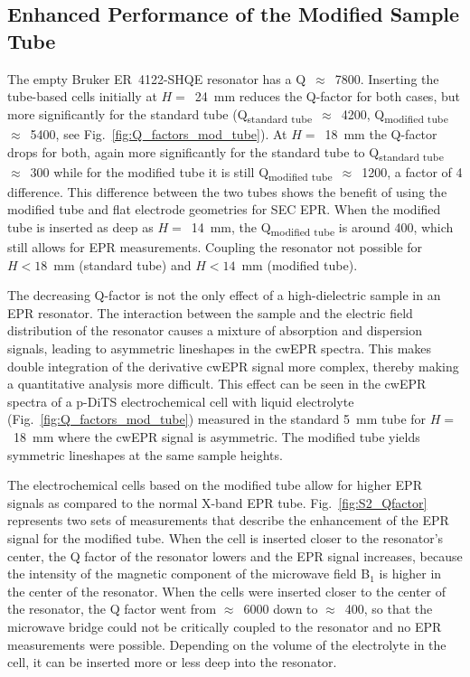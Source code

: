 \subsection{Enhanced Performance of the Modified Sample Tube}\label{Q-factor_SNR}

The empty Bruker ER~4122-SHQE resonator has a Q~$\approx$~7800. Inserting the tube-based cells initially at $H=$~24~mm reduces the Q-factor for both cases, but more significantly for the standard tube (Q\textsubscript{standard tube}~$\approx$~4200, Q\textsubscript{modified tube}~$\approx$~5400, see Fig.~\ref{fig:Q_factors_mod_tube}). At $H=$~18~mm the Q-factor drops for both, again more significantly for the standard tube to Q\textsubscript{standard tube}~$\approx$~300 while for the modified tube it is still Q\textsubscript{modified tube}~$\approx$~1200, a factor of 4 difference. This difference between the two tubes shows the benefit of using the modified tube and flat electrode geometries for SEC EPR. When the modified tube is inserted as deep as $H=$~14~mm, the Q\textsubscript{modified tube} is around 400, which still allows for EPR measurements. Coupling the resonator not possible for $H<18$~mm (standard tube) and $H<14$~mm (modified tube).

\par
The decreasing Q-factor is not the only effect of a high-dielectric sample in an EPR resonator. The interaction between the sample and the electric field distribution of the resonator causes a mixture of absorption and dispersion signals, leading to asymmetric lineshapes in the cwEPR spectra. This makes double integration of the derivative cwEPR signal more complex, thereby making a quantitative analysis more difficult. This effect can be seen in the cwEPR spectra of a p-DiTS electrochemical cell with liquid electrolyte (Fig.~\ref{fig:Q_factors_mod_tube}) measured in the standard 5~mm tube for $H=$~18~mm where the cwEPR signal is asymmetric. The modified tube yields symmetric lineshapes at the same sample heights.

\par

The electrochemical cells based on the modified tube allow for higher EPR signals as compared to the normal X-band EPR tube. Fig.~\ref{fig:S2_Qfactor} represents two sets of measurements that describe the enhancement of the EPR signal for the modified tube. When the cell is inserted closer to the resonator's center, the Q factor of the resonator lowers and the EPR signal increases, because the intensity of the magnetic component of the microwave field B$_1$ is higher in the center of the resonator. When the cells were inserted closer to the center of the resonator, the Q factor went from $\approx$~6000 down to $\approx$~400, so that the microwave bridge could not be critically coupled to the resonator and no EPR measurements were possible. Depending on the volume of the electrolyte in the cell, it can be inserted more or less deep into the resonator.

